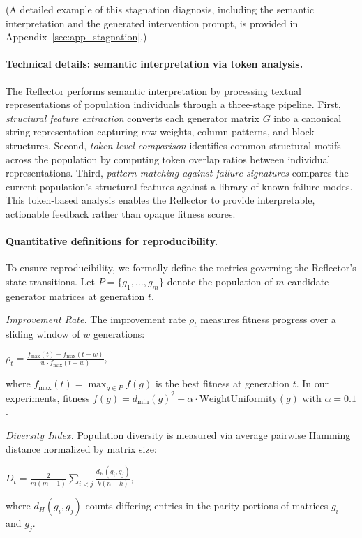 (A detailed example of this stagnation diagnosis, including the semantic interpretation and the generated intervention prompt, is provided in Appendix~\ref{sec:app_stagnation}.)

\paragraph{Technical details: semantic interpretation via token analysis.} The Reflector performs semantic interpretation by processing textual representations of population individuals through a three-stage pipeline. First, \textit{structural feature extraction} converts each generator matrix $G$ into a canonical string representation capturing row weights, column patterns, and block structures. Second, \textit{token-level comparison} identifies common structural motifs across the population by computing token overlap ratios between individual representations. Third, \textit{pattern matching against failure signatures} compares the current population's structural features against a library of known failure modes. This token-based analysis enables the Reflector to provide interpretable, actionable feedback rather than opaque fitness scores.

\paragraph{Quantitative definitions for reproducibility.} To ensure reproducibility, we formally define the metrics governing the Reflector's state transitions. Let $P = \{g_1, \ldots, g_m\}$ denote the population of $m$ candidate generator matrices at generation $t$.

\textit{Improvement Rate.} The improvement rate $\rho_t$ measures fitness progress over a sliding window of $w$ generations:
\begin{center}
$\displaystyle \rho_t = \frac{f_{\max}(t) - f_{\max}(t - w)}{w \cdot f_{\max}(t - w)}, $
\end{center}
where $f_{\max}(t) = \max_{g \in P} f(g)$ is the best fitness at generation $t$. In our experiments, fitness $f(g) = d_{\min}(g)^2 + \alpha \cdot \text{WeightUniformity}(g)$ with $\alpha = 0.1$.

\textit{Diversity Index.} Population diversity is measured via average pairwise Hamming distance normalized by matrix size:
\begin{center}
$\displaystyle D_t = \frac{2}{m(m - 1)} \sum_{i < j} \frac{d_H(g_i, g_j)}{k(n - k)}, $
\end{center}
where $d_H(g_i, g_j)$ counts differing entries in the parity portions of matrices $g_i$ and $g_j$.

